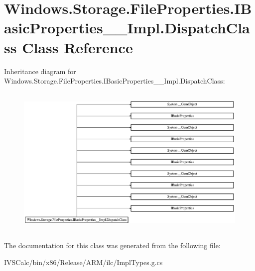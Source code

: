 \hypertarget{class_windows_1_1_storage_1_1_file_properties_1_1_i_basic_properties_____impl_1_1_dispatch_class}{}\section{Windows.\+Storage.\+File\+Properties.\+I\+Basic\+Properties\+\_\+\+\_\+\+Impl.\+Dispatch\+Class Class Reference}
\label{class_windows_1_1_storage_1_1_file_properties_1_1_i_basic_properties_____impl_1_1_dispatch_class}
Inheritance diagram for Windows.\+Storage.\+File\+Properties.\+I\+Basic\+Properties\+\_\+\+\_\+\+Impl.\+Dispatch\+Class\+:\begin{figure}[H]
\begin{center}
\leavevmode
\includegraphics[height=7.386091cm]{class_windows_1_1_storage_1_1_file_properties_1_1_i_basic_properties_____impl_1_1_dispatch_class}
\end{center}
\end{figure}


The documentation for this class was generated from the following file\+:\begin{DoxyCompactItemize}
\item 
I\+V\+S\+Calc/bin/x86/\+Release/\+A\+R\+M/ilc/Impl\+Types.\+g.\+cs\end{DoxyCompactItemize}
